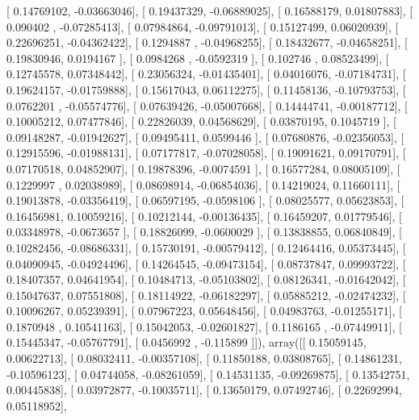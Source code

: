 \documentclass{article}
\begin{document}
       [ 0.14769102, -0.03663046],
       [ 0.19437329, -0.06889025],
       [ 0.16588179,  0.01807883],
       [ 0.090402  , -0.07285413],
       [ 0.07984864, -0.09791013],
       [ 0.15127499,  0.06020939],
       [ 0.22696251, -0.04362422],
       [ 0.1294887 , -0.04968255],
       [ 0.18432677, -0.04658251],
       [ 0.19830946,  0.0194167 ],
       [ 0.0984268 , -0.0592319 ],
       [ 0.102746  ,  0.08523499],
       [ 0.12745578,  0.07348442],
       [ 0.23056324, -0.01435401],
       [ 0.04016076, -0.07184731],
       [ 0.19624157, -0.01759888],
       [ 0.15617043,  0.06112275],
       [ 0.11458136, -0.10793753],
       [ 0.0762201 , -0.05574776],
       [ 0.07639426, -0.05007668],
       [ 0.14444741, -0.00187712],
       [ 0.10005212,  0.07477846],
       [ 0.22826039,  0.04568629],
       [ 0.03870195,  0.1045719 ],
       [ 0.09148287, -0.01942627],
       [ 0.09495411,  0.0599446 ],
       [ 0.07680876, -0.02356053],
       [ 0.12915596, -0.01988131],
       [ 0.07177817, -0.07028058],
       [ 0.19091621,  0.09170791],
       [ 0.07170518,  0.04852907],
       [ 0.19878396, -0.0074591 ],
       [ 0.16577284,  0.08005109],
       [ 0.1229997 ,  0.02038989],
       [ 0.08698914, -0.06854036],
       [ 0.14219024,  0.11660111],
       [ 0.19013878, -0.03356419],
       [ 0.06597195, -0.0598106 ],
       [ 0.08025577,  0.05623853],
       [ 0.16456981,  0.10059216],
       [ 0.10212144, -0.00136435],
       [ 0.16459207,  0.01779546],
       [ 0.03348978, -0.0673657 ],
       [ 0.18826099, -0.0600029 ],
       [ 0.13838855,  0.06840849],
       [ 0.10282456, -0.08686331],
       [ 0.15730191, -0.00579412],
       [ 0.12464416,  0.05373445],
       [ 0.04090945, -0.04924496],
       [ 0.14264545, -0.09473154],
       [ 0.08737847,  0.09993722],
       [ 0.18407357,  0.04641954],
       [ 0.10484713, -0.05103802],
       [ 0.08126341, -0.01642042],
       [ 0.15047637,  0.07551808],
       [ 0.18114922, -0.06182297],
       [ 0.05885212, -0.02474232],
       [ 0.10096267,  0.05239391],
       [ 0.07967223,  0.05648456],
       [ 0.04983763, -0.01255171],
       [ 0.1870948 ,  0.10541163],
       [ 0.15042053, -0.02601827],
       [ 0.1186165 , -0.07449911],
       [ 0.15445347, -0.05767791],
       [ 0.0456992 , -0.115899  ]]), array([[ 0.15059145,  0.00622713],
       [ 0.08032411, -0.00357108],
       [ 0.11850188,  0.03808765],
       [ 0.14861231, -0.10596123],
       [ 0.04744058, -0.08261059],
       [ 0.14531135, -0.09269875],
       [ 0.13542751,  0.00445838],
       [ 0.03972877, -0.10035711],
       [ 0.13650179,  0.07492746],
       [ 0.22692994,  0.05118952],
\end{document}
